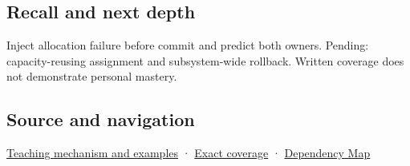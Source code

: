 \subsection{Recall and next depth}\label{appendix-bea6beb5350f-recall-and-next-depth}

Inject allocation failure before commit and predict both owners. Pending: capacity-reusing assignment and subsystem-wide rollback. Written coverage does not demonstrate personal mastery.

\subsection{Source and navigation}\label{appendix-bea6beb5350f-source-and-navigation}

\hyperref[01-foundations-i-ch003-replacing-a-value-is-not-creating-an-object]{Teaching mechanism and examples} · \hyperref[appendix-fd090d982a15-m009---parts-127-147]{Exact coverage} · \hyperref[appendix-4ad47bdd269a]{Dependency Map}
